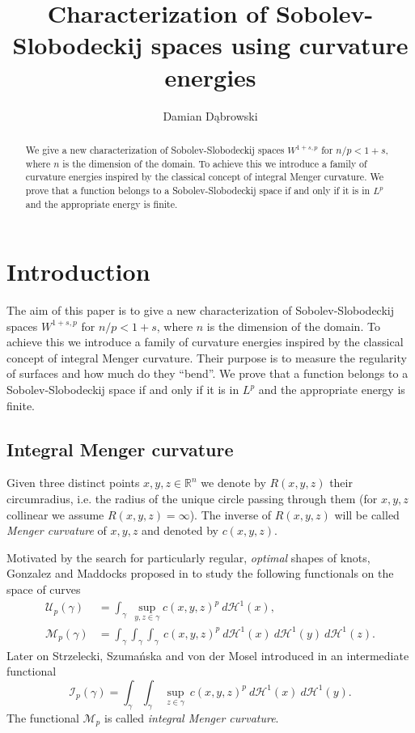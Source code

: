 \documentclass[11pt]{amsart}
\title[Characterization of Sobolev-Slobodeckij spaces...]{Characterization of Sobolev-Slobodeckij spaces using curvature energies}
\author{Damian D\k{a}browski}
\date{}
\newcommand{\R}{\mathbb{R}}
\renewcommand{\H}{\mathscr{H}}
\newcommand{\Mp}{\mathscr{M}_p}
\theoremstyle{definition}
\begin{document}
	\begin{abstract}
		We give a new characterization of Sobolev-Slobodeckij spaces $W^{1+s,p}$ for $n/p<1+s$, where $n$ is the dimension of the domain. To achieve this we introduce a family of curvature energies inspired by the classical concept of integral Menger curvature. We prove that a function belongs to a Sobolev-Slobodeckij space if and only if it is in $L^p$ and the appropriate energy is finite.
	\end{abstract}
	
	\maketitle
	\section{Introduction}
	The aim of this paper is to give a new characterization of Sobolev-Slobodeckij spaces $W^{1+s,p}$ for $n/p<1+s$, where $n$ is the dimension of the domain. To achieve this we introduce a family of curvature energies inspired by the classical concept of integral Menger curvature. Their purpose is to measure the regularity of surfaces and how much do they ``bend''. We prove that a function belongs to a Sobolev-Slobodeckij space if and only if it is in $L^p$ and the appropriate energy is finite.
	
	\subsection*{Integral Menger curvature}
	Given three distinct points $x,y,z\in\R^n$ we denote by $R(x,y,z)$ their circumradius, i.e. the radius of the unique circle passing through them (for $x,y,z$ collinear we assume $R(x,y,z)=\infty$). The inverse of $R(x,y,z)$ will be called \emph{Menger curvature} of $x,y,z$ and denoted by $c(x,y,z)$.
	
	Motivated by the search for particularly regular, \emph{optimal} shapes of knots, Gonzalez and Maddocks proposed in \cite{gonzalez1999global} to study the following functionals on the space of curves
	\begin{align*}
	\mathscr{U}_p(\gamma)&=\int_{\gamma}\ \sup_{y,z\in\gamma}c(x,y,z)^p\ d\H^1(x),\\
	\Mp(\gamma) &= \int_{\gamma}\int_{\gamma}\int_{\gamma}\ c(x,y,z)^p\ d\H^1(x)\ d\H^1(y)\ d\H^1(z).
	\end{align*}
	Later on Strzelecki, Szumańska and von der Mosel introduced in \cite{strzelecki2009geometric} an intermediate functional
	\[
	\mathscr{I}_p(\gamma) = \int_{\gamma}\int_{\gamma}\ \sup_{z\in\gamma}\ c(x,y,z)^p\ d\H^1(x)\ d\H^1(y).
	\]
	The functional $\Mp$ is called \emph{integral Menger curvature}. 
	
\end{document}
